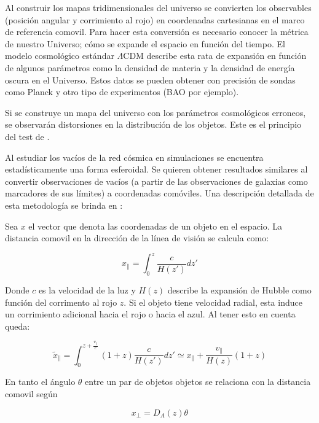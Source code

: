 \documentclass[preprint]{aastex62}
\begin{document}
  Al construir los mapas tridimensionales del universo se convierten los observables (posición
  angular y corrimiento al rojo) en coordenadas cartesianas en el marco de referencia comovil.
  Para hacer esta conversión es necesario conocer la métrica de nuestro Universo; cómo se
  expande el espacio en función del tiempo. El modelo cosmológico estándar $\Lambda$CDM
  describe esta rata de expansión en función de algunos parámetros como la densidad de materia
  y la densidad de energía oscura en el Universo. Estos datos se pueden obtener con precisión
  de sondas como Planck y otro tipo de experimentos (BAO por ejemplo).

  Si se construye un mapa del universo con los parámetros cosmológicos erroneos, se observarán
  distorsiones en la distribución de los objetos. Este es el principio del test de
  \citet{AlcockPaczynski1979}.

  Al estudiar los vacíos de la red cósmica en simulaciones se encuentra estadísticamente una
  forma esferoidal. Se quieren obtener resultados similares al convertir observaciones de
  vacíos (a partir de las observaciones de galaxias como marcadores de sus límites) a coordenadas
  comóviles. Una descripción detallada de esta metodología se brinda en \citet{Hamaus2015}:

  Sea $x$ el vector que denota las coordenadas de un objeto en el espacio. La distancia comovil en la
  dirección de la línea de visión se calcula como:

  \begin{equation}
    x_{\parallel} = \int _0 ^z \frac{c}{H(z')}dz'
  \end{equation}

  Donde $c$ es la velocidad de la luz y $H(z)$ describe la expansión de Hubble como función del
  corrimento al rojo $z$. Si el objeto tiene velocidad radial, esta induce un corrimiento adicional
  hacia el rojo o hacia el azul. Al tener esto en cuenta queda:

  \begin{equation}
    \tilde{x}_{\parallel} = \int _0 ^{z + \frac{v_\parallel}{c}}(1+z) \frac{c}{H(z')}dz'
    \simeq x_\parallel + \frac{v_\parallel}{H(z)}(1+z)
  \end{equation}

  En tanto el ángulo $\theta$  entre un par de objetos objetos se relaciona con la distancia comovil según

  \begin{equation}
    x_{\perp} = D_A(z)\theta
  \end{equation}
  
\end{document}

